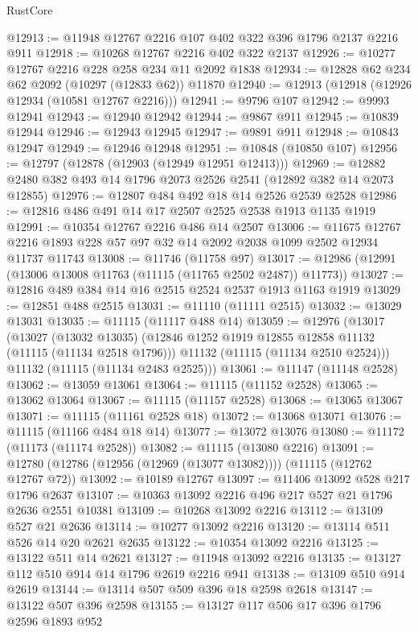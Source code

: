 \begin{lexlean}{RustCore}
\begin{coremodule}
@12913 := @11948 @12767 @2216 @107 @402 @322 @396 @1796 @2137 @2216 @911
@12918 := @10268 @12767 @2216 @402 @322 @2137
@12926 := @10277 @12767 @2216 @228 @258 @234 @11 @2092 @1838
@12934 := @12828 @62 @234 @62 @2092 (@10297 (@12833 @62)) @11870
@12940 := @12913 (@12918 (@12926 @12934 (@10581 @12767 @2216)))
@12941 := @9796 @107
@12942 := @9993 @12941
@12943 := @12940 @12942
@12944 := @9867 @911
@12945 := @10839 @12944
@12946 := @12943 @12945
@12947 := @9891 @911
@12948 := @10843 @12947
@12949 := @12946 @12948
@12951 := @10848 (@10850 @107)
@12956 := @12797 (@12878 (@12903 (@12949 @12951 @12413)))
@12969 := @12882 @2480 @382 @493 @14 @1796 @2073 @2526 @2541 (@12892 @382 @14 @2073 @12855)
@12976 := @12807 @484 @492 @18 @14 @2526 @2539 @2528
@12986 := @12816 @486 @491 @14 @17 @2507 @2525 @2538 @1913 @1135 @1919
@12991 := @10354 @12767 @2216 @486 @14 @2507
@13006 := @11675
    @12767
    @2216
    @1893
    @228
    @57
    @97
    @32
    @14
    @2092
    @2038
    @1099
    @2502
    @12934
    @11737
    @11743
@13008 := @11746 (@11758 @97)
@13017 := @12986 (@12991 (@13006 @13008 @11763 (@11115 (@11765 @2502 @2487)) @11773))
@13027 := @12816 @489 @384 @14 @16 @2515 @2524 @2537 @1913 @1163 @1919
@13029 := @12851 @488 @2515
@13031 := @11110 (@11111 @2515)
@13032 := @13029 @13031
@13035 := @11115 (@11117 @488 @14)
@13059 := @12976
    (@13017
      (@13027
        (@13032 @13035)
        (@12846 @1252 @1919 @12855 @12858 @11132 (@11115 (@11134 @2518 @1796)))
        @11132
        (@11115 (@11134 @2510 @2524)))
      @11132
      (@11115 (@11134 @2483 @2525)))
@13061 := @11147 (@11148 @2528)
@13062 := @13059 @13061
@13064 := @11115 (@11152 @2528)
@13065 := @13062 @13064
@13067 := @11115 (@11157 @2528)
@13068 := @13065 @13067
@13071 := @11115 (@11161 @2528 @18)
@13072 := @13068 @13071
@13076 := @11115 (@11166 @484 @18 @14)
@13077 := @13072 @13076
@13080 := @11172 (@11173 (@11174 @2528))
@13082 := @11115 (@13080 @2216)
@13091 := @12780 (@12786 (@12956 (@12969 (@13077 @13082)))) (@11115 (@12762 @12767 @72))
@13092 := @10189 @12767
@13097 := @11406 @13092 @528 @217 @1796 @2637
@13107 := @10363 @13092 @2216 @496 @217 @527 @21 @1796 @2636 @2551 @10381
@13109 := @10268 @13092 @2216
@13112 := @13109 @527 @21 @2636
@13114 := @10277 @13092 @2216
@13120 := @13114 @511 @526 @14 @20 @2621 @2635
@13122 := @10354 @13092 @2216
@13125 := @13122 @511 @14 @2621
@13127 := @11948 @13092 @2216
@13135 := @13127 @112 @510 @914 @14 @1796 @2619 @2216 @941
@13138 := @13109 @510 @914 @2619
@13144 := @13114 @507 @509 @396 @18 @2598 @2618
@13147 := @13122 @507 @396 @2598
@13155 := @13127 @117 @506 @17 @396 @1796 @2596 @1893 @952

\end{coremodule}
\end{lexlean}
